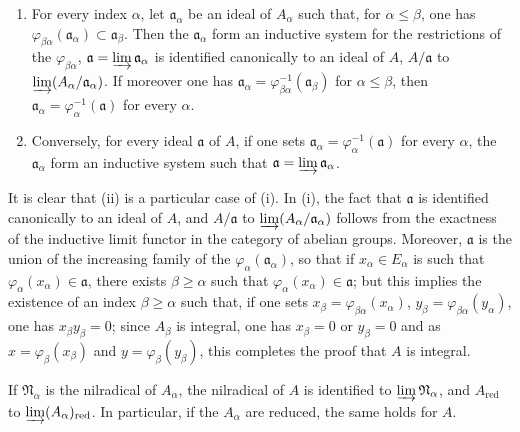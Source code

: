\begin{proposition}[5.13.1]
\label{IV.5.13.1}
\begin{enumerate}
  \item[\rm(i)] For every index $\alpha$, let $\mathfrak{a}_\alpha$ be an ideal of $A_\alpha$ such that, for $\alpha\leqslant\beta$, one has $\varphi_{\beta\alpha}(\mathfrak{a}_\alpha)\subset\mathfrak{a}_\beta$.
Then the $\mathfrak{a}_\alpha$ form an inductive system for the restrictions of the $\varphi_{\beta\alpha}$, $\mathfrak{a}=\varinjlim\mathfrak{a}_\alpha$ is identified canonically to an ideal of $A$, $A/\mathfrak{a}$ to $\varinjlim(A_\alpha/\mathfrak{a}_\alpha)$.
If moreover one has $\mathfrak{a}_\alpha=\varphi_{\beta\alpha}^{-1}(\mathfrak{a}_\beta)$ for $\alpha\leqslant\beta$, then $\mathfrak{a}_\alpha=\varphi_\alpha^{-1}(\mathfrak{a})$ for every $\alpha$.
  \item[\rm(ii)] Conversely, for every ideal $\mathfrak{a}$ of $A$, if one sets $\mathfrak{a}_\alpha=\varphi_\alpha^{-1}(\mathfrak{a})$ for every $\alpha$, the $\mathfrak{a}_\alpha$ form an inductive system such that $\mathfrak{a}=\varinjlim\mathfrak{a}_\alpha$.
\end{enumerate}
\end{proposition}

It is clear that (ii) is a particular case of (i).
In (i), the fact that $\mathfrak{a}$ is identified canonically to an ideal of $A$, and $A/\mathfrak{a}$ to $\varinjlim(A_\alpha/\mathfrak{a}_\alpha)$ follows from the exactness of the inductive limit functor in the category of abelian groups.
Moreover, $\mathfrak{a}$ is the union of the increasing family of the $\varphi_\alpha(\mathfrak{a}_\alpha)$, so that if $x_\alpha\in E_\alpha$ is such that $\varphi_\alpha(x_\alpha)\in\mathfrak{a}$, there exists $\beta\geqslant\alpha$ such that $\varphi_\alpha(x_\alpha)\in\mathfrak{a}$; but this implies the existence of an index $\beta\geqslant\alpha$ such that, if one sets $x_\beta=\varphi_{\beta\alpha}(x_\alpha)$, $y_\beta=\varphi_{\beta\alpha}(y_\alpha)$, one has $x_\beta y_\beta=0$; since $A_\beta$ is integral, one has $x_\beta=0$ or $y_\beta=0$ and as $x=\varphi_\beta(x_\beta)$ and $y=\varphi_\beta(y_\beta)$, this completes the proof that $A$ is integral.

\begin{corollary}[5.13.2]
\label{IV.5.13.2}
If $\mathfrak{N}_\alpha$ is the nilradical of $A_\alpha$, the nilradical of $A$ is identified to $\varinjlim\mathfrak{N}_\alpha$, and $A_{\mathrm{red}}$ to $\varinjlim(A_\alpha)_{\mathrm{red}}$.
In particular, if the $A_\alpha$ are reduced, the same holds for $A$.
\end{corollary}

